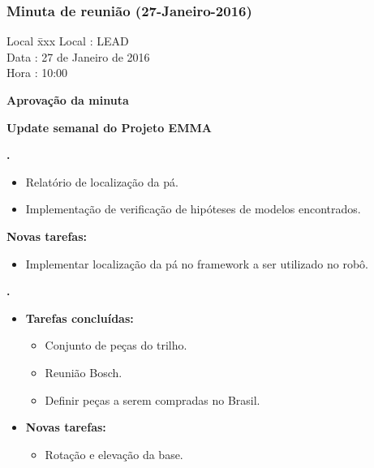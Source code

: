 \subsubsection{Minuta de reunião (27-Janeiro-2016)}

\begin{tabbing}
  Local \= xxx \kill
  Local \> : LEAD \\
  Data  \> : 27 de Janeiro de 2016 \\
  Hora  \> : 10:00
\end{tabbing} 


\textbf{Aprovação da minuta}

\textbf{Update semanal do Projeto EMMA}

						
\textbf{\gabriel.} 
	\begin{itemize}
			\item Relatório de localização da pá.
			\item Implementação de verificação de hipóteses de modelos encontrados.
			\end{itemize}
		
		\item \textbf{Novas tarefas:}
			\begin{itemize} 
				\item Implementar localização da pá no framework a ser utilizado no robô.
			\end{itemize}

					
   \textbf{.} 
	\begin{itemize}
		\item \textbf{Tarefas concluídas:}
			\begin{itemize}    
			    \item Conjunto de peças do trilho.
			    \item Reunião Bosch.
			    \item Definir peças a serem compradas no Brasil.
				
			\end{itemize}
		
		\item \textbf{Novas tarefas:}
			\begin{itemize} 
			    \item Rotação e elevação da base.
			\end{itemize}
	\end{itemize}

